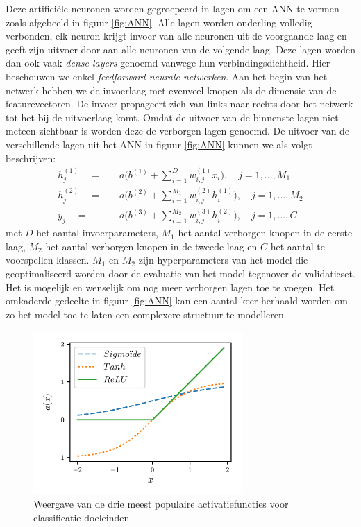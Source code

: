\npar Deze artifici\"ele neuronen worden gegroepeerd in lagen om een ANN te vormen zoals afgebeeld in figuur \ref{fig:ANN}. Alle lagen worden onderling volledig verbonden, elk neuron krijgt invoer van alle neuronen uit de voorgaande laag en geeft zijn uitvoer door aan alle neuronen van de volgende laag. Deze lagen worden dan ook vaak \textit{dense layers} genoemd vanwege hun verbindingsdichtheid.
\npar Hier beschouwen we enkel \textit{feedforward neurale netwerken}. Aan het begin van het netwerk hebben we de invoerlaag met evenveel knopen als de dimensie van de featurevectoren. De invoer propageert zich van links naar rechts door het netwerk tot het bij de uitvoerlaag komt. Omdat de uitvoer van de binnenste lagen niet meteen zichtbaar is worden deze de verborgen lagen genoemd.
\npar De uitvoer van de verschillende lagen uit het ANN in figuur \ref{fig:ANN} kunnen we als volgt beschrijven:
\begin{equation}
\begin{aligned}
h^{(1)}_j\quad=&\quad a\bigg(b^{(1)}+\sum_{i=1}^{D}w^{(1)}_{i,j}x_i\bigg),\quad j=1,...,M_1\\
h^{(2)}_j\quad=&\quad a\bigg(b^{(2)}+\sum_{i=1}^{M_1}w^{(2)}_{i,j}h^{(1)}_i\bigg),\quad j=1,...,M_2\\ 
y_j\quad=&\quad a\bigg(b^{(3)}+\sum_{i=1}^{M_2}w^{(3)}_{i,j}h^{(2)}_i\bigg),\quad j=1,...,C 
\end{aligned}
\end{equation}
met $D$ het aantal invoerparameters, $M_1$ het aantal verborgen knopen in de eerste laag, $M_2$ het aantal verborgen knopen in de tweede laag en $C$ het aantal te voorspellen klassen. $M_1$ en $M_2$ zijn hyperparameters van het model die geoptimaliseerd worden door de evaluatie van het model tegenover de validatieset.
\npar Het is mogelijk en wenselijk om nog meer verborgen lagen toe te voegen. Het omkaderde gedeelte in figuur \ref{fig:ANN} kan een aantal keer herhaald worden om zo het model toe te laten een complexere structuur te modelleren.
\begin{figure}[ht]
	\begin{center}
		\includegraphics[width=8cm,keepaspectratio]{figuren/activatiefuncties.pdf}
		\caption{Weergave van de drie meest populaire activatiefuncties voor classificatie doeleinden \label{fig:activatie-fun}}
	\end{center}
\end{figure}
